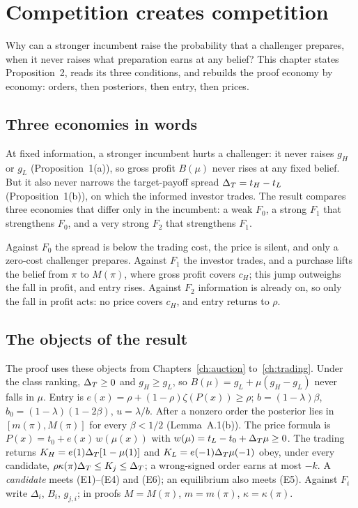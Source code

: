 \chapter{Competition creates competition}\label{ch:ccc}

\begin{chapterplan}
Why can a stronger incumbent raise the probability that a challenger prepares, when it never raises what
preparation earns at any belief? This chapter states Proposition~2, reads its three conditions, and rebuilds the
proof economy by economy: orders, then posteriors, then entry, then prices.
\end{chapterplan}

\section{Three economies in words}\label{sec:ccc-story}

At fixed information, a stronger incumbent hurts a challenger: it never raises \(g_H\) or \(g_L\)
(Proposition~1(a)), so gross profit \(B(\mu)\) never rises at any fixed belief. But it also never narrows the
target-payoff spread \(\Delta_T=t_H-t_L\) (Proposition~1(b)), on which the informed investor trades. The result
compares three economies that differ only in the incumbent: a weak \(F_0\), a strong \(F_1\) that strengthens
\(F_0\), and a very strong \(F_2\) that strengthens \(F_1\).

\begin{intuition}
Against \(F_0\) the spread is below the trading cost, the price is silent, and only a zero-cost challenger
prepares. Against \(F_1\) the investor trades, and a purchase lifts the belief from \(\pi\) to \(M(\pi)\), where
gross profit covers \(c_H\); this jump outweighs the fall in profit, and entry rises. Against \(F_2\) information
is already on, so only the fall in profit acts: no price covers \(c_H\), and entry returns to \(\rho\).
\end{intuition}

\section{The objects of the result}\label{sec:ccc-setup}

The proof uses these objects from Chapters~\ref{ch:auction} to~\ref{ch:trading}. Under the class ranking,
\(\Delta_T\ge0\) and \(g_H\ge g_L\), so \(B(\mu)=g_L+\mu(g_H-g_L)\) never falls in \(\mu\). Entry is
\(e(x)=\rho+(1-\rho)\zeta(P(x))\ge\rho\); \(b=(1-\lambda)\beta\), \(b_0=(1-\lambda)(1-2\beta)\), \(u=\lambda/b\). After a
nonzero order the posterior lies in \([m(\pi),M(\pi)]\) for every \(\beta<1/2\) (Lemma~A.1(b)). The price formula
is \(P(x)=t_0+e(x)\,w(\mu(x))\) with \(w(\mu)=t_L-t_0+\Delta_T\mu\ge0\). The trading returns
\(K_H=e(1)\Delta_T[1-\mu(1)]\) and \(K_L=e(-1)\Delta_T\mu(-1)\) obey, under every candidate,
\(\rho\kappa(\pi)\Delta_T\le K_j\le\Delta_T\); a wrong-signed order earns at most \(-k\). A \emph{candidate} meets
(E1)--(E4) and (E6); an equilibrium also meets (E5). Against \(F_i\) write \(\Delta_i\), \(B_i\), \(g_{j,i}\); in
proofs \(M=M(\pi)\), \(m=m(\pi)\), \(\kappa=\kappa(\pi)\).

